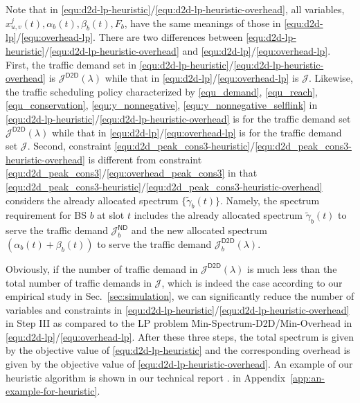 Note that in \eqref{equ:d2d-lp-heuristic}/\eqref{equ:d2d-lp-heuristic-overhead}, all variables, $x^{j}_{u,v}(t), \alpha_b(t),  \beta_b(t), F_b$, have
the same meanings of those in \eqref{equ:d2d-lp}/\eqref{equ:overhead-lp}. There are two differences between \eqref{equ:d2d-lp-heuristic}/\eqref{equ:d2d-lp-heuristic-overhead}
and \eqref{equ:d2d-lp}/\eqref{equ:overhead-lp}. First, the traffic demand set in \eqref{equ:d2d-lp-heuristic}/\eqref{equ:d2d-lp-heuristic-overhead} is
$\mathcal{J}^{\textsf{D2D}}(\lambda)$ while that in \eqref{equ:d2d-lp}/\eqref{equ:overhead-lp} is $\mathcal{J}$.
Likewise, the traffic scheduling policy characterized by \eqref{equ_demand}, \eqref{equ_reach},
\eqref{equ_conservation}, \eqref{equ:y_nonnegative}, \eqref{equ:y_nonnegative_selflink} in \eqref{equ:d2d-lp-heuristic}/\eqref{equ:d2d-lp-heuristic-overhead}  is  for the traffic demand set
$\mathcal{J}^{\textsf{D2D}}(\lambda)$ while that in \eqref{equ:d2d-lp}/\eqref{equ:overhead-lp} is for the traffic demand set $\mathcal{J}$.
Second, constraint \eqref{equ:d2d_peak_cons3-heuristic}/\eqref{equ:d2d_peak_cons3-heuristic-overhead}
is different from constraint \eqref{equ:d2d_peak_cons3}/\eqref{equ:overhead_peak_cons3} in that \eqref{equ:d2d_peak_cons3-heuristic}/\eqref{equ:d2d_peak_cons3-heuristic-overhead} considers the already allocated spectrum $\{\tilde{\gamma}_b(t)\}$.
Namely, the spectrum requirement for BS $b$ at slot $t$ includes the already allocated spectrum
$\tilde{\gamma}_b(t)$ to serve the traffic demand $\mathcal{J}_b^{\textsf{ND}}$
and the new allocated spectrum $(\alpha_b(t)+\beta_b(t))$ to serve the traffic demand
$\mathcal{J}_b^{\textsf{D2D}}(\lambda)$.




Obviously, if the number of traffic demand in $\mathcal{J}^{\textsf{D2D}}(\lambda)$ is much less than the total number of traffic demands in $\mathcal{J}$, which is indeed the case according to our empirical study in Sec.~\ref{sec:simulation},
we can significantly reduce the number of variables and constraints in
\eqref{equ:d2d-lp-heuristic}/\eqref{equ:d2d-lp-heuristic-overhead}
in Step III as compared to the LP problem \textsf{Min-Spectrum-D2D}/\textsf{Min-Overhead} in \eqref{equ:d2d-lp}/\eqref{equ:overhead-lp}.
After these three steps, the total spectrum is given by the objective value of \eqref{equ:d2d-lp-heuristic}
and the corresponding overhead is given by the objective value of \eqref{equ:d2d-lp-heuristic-overhead}.
An example of our heuristic algorithm is shown
\ifx \ISTR \undefined
in our technical report \cite{TR}.
\else
in Appendix~\ref{app:an-example-for-heuristic}.
\fi




